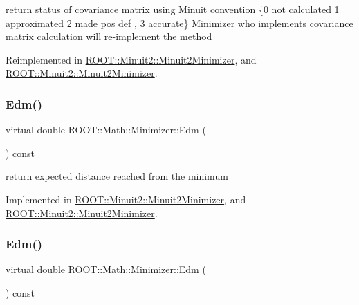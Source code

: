return status of covariance matrix using Minuit convention \{0 not calculated 1 approximated 2 made pos def , 3 accurate\} \mbox{\hyperlink{classROOT_1_1Math_1_1Minimizer}{Minimizer}} who implements covariance matrix calculation will re-\/implement the method 

Reimplemented in \mbox{\hyperlink{classROOT_1_1Minuit2_1_1Minuit2Minimizer_ad9f4873b9651626d2b83cf7eab826b0f}{R\+O\+O\+T\+::\+Minuit2\+::\+Minuit2\+Minimizer}}, and \mbox{\hyperlink{classROOT_1_1Minuit2_1_1Minuit2Minimizer_ad9f4873b9651626d2b83cf7eab826b0f}{R\+O\+O\+T\+::\+Minuit2\+::\+Minuit2\+Minimizer}}.

\mbox{\label{classROOT_1_1Math_1_1Minimizer_a990c6935849a3fb31aedab1df6c26f28}} 
\subsubsection{\texorpdfstring{Edm()}{Edm()}\hspace{0.1cm}{\footnotesize\ttfamily [1/2]}}
{\footnotesize\ttfamily virtual double R\+O\+O\+T\+::\+Math\+::\+Minimizer\+::\+Edm (\begin{DoxyParamCaption}{ }\end{DoxyParamCaption}) const\hspace{0.3cm}{\ttfamily [pure virtual]}}



return expected distance reached from the minimum 



Implemented in \mbox{\hyperlink{classROOT_1_1Minuit2_1_1Minuit2Minimizer_ab9c1bfaaaf4c12acd1fd96ece3509269}{R\+O\+O\+T\+::\+Minuit2\+::\+Minuit2\+Minimizer}}, and \mbox{\hyperlink{classROOT_1_1Minuit2_1_1Minuit2Minimizer_ab9c1bfaaaf4c12acd1fd96ece3509269}{R\+O\+O\+T\+::\+Minuit2\+::\+Minuit2\+Minimizer}}.

\mbox{\label{classROOT_1_1Math_1_1Minimizer_a990c6935849a3fb31aedab1df6c26f28}} 
\subsubsection{\texorpdfstring{Edm()}{Edm()}\hspace{0.1cm}{\footnotesize\ttfamily [2/2]}}
{\footnotesize\ttfamily virtual double R\+O\+O\+T\+::\+Math\+::\+Minimizer\+::\+Edm (\begin{DoxyParamCaption}{ }\end{DoxyParamCaption}) const\hspace{0.3cm}{\ttfamily [pure virtual]}}



